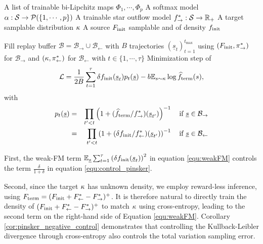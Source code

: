 \documentclass{article}
\theoremstyle{plain}
\theoremstyle{definition}
\theoremstyle{remark}
\theoremstyle{fact}
\begin{document}
\begin{algorithm}
\caption{Ergodic flow: IL training}\label{alg:IL_EGF}
\begin{algorithmic}
 A list of trainable bi-Lipchitz maps $\Phi_1,\cdots, \Phi_p$
 A softmax model $\alpha:\mathcal S \rightarrow \mathcal P(\{1,\cdots,p\})$
 A trainable star outflow  model $f^*_\rightarrow:\mathcal S\rightarrow \mathbb R_+$
 A target samplable distribution $\kappa$
 A source $F_{\mathrm{init}}$  samplable and of  density  $f_{\mathrm{init}}$
 
\REPEAT
\STATE Fill replay buffer $\mathcal B=\mathcal B_{\rightarrow} \cup \mathcal B_{\leftarrow}$ with $B$ trajectories $(\underline s_t)_{t=1}^{t_{\text{max}}}$ using $(F_{\mathrm{init}}, \pi_{\rightarrow}^*)$ for $\mathcal B_{\rightarrow}$ and $(\kappa, \pi_{\leftarrow}^*)$ for $\mathcal B_{\leftarrow}$ with $t\in \{1,\cdots,\tau\}$
\STATE Minimization step of
$$ 
 \mathcal L =\frac{1}{2B}\sum_{t=1}^\tau\delta f_{\mathrm{init}}(\underline s_t)p_t(\underline s)- b \mathbb E_{s\sim \kappa}\log \widehat{f}_{\mathrm{term}}(s),
$$
with 
\begin{eqnarray*}
   p_t(\underline s) &=&\prod_{t'<t}  \left(1+(\widehat{f}_{\mathrm{term}}/f^*_{\rightarrow})(\underline s_{t'})\right)^{-1}\quad \text{if } \underline s\in \mathcal B_{\rightarrow}\\
     &=&\prod_{t'<t}  \left(1+(\delta f_{\mathrm{init}}/f^*_{\leftarrow})(\underline s_{t'})\right)^{-1}\quad \text{if } \underline s\in \mathcal B_{\leftarrow} 
\end{eqnarray*}
\end{algorithmic}
\end{algorithm}


First, the weak-FM term $\mathbb E_{\underline s} \sum_{t=1}^\tau \left(\delta f_{\mathrm{init}}(\underline s_t)\right)^2$ in equation \eqref{equ:weakFM} controls the term $\frac{\delta}{1 + \delta}$ in equation \eqref{equ:control_pinsker}.


Second, since the target $\kappa$ has unknown density, we employ reward-less inference, using $F_{\mathrm{term}} = (F_{\mathrm{init}}+F^*_{\leftarrow}-F^*_{\rightarrow})^+$.
It is therefore natural to directly train the density of  $(F_{\mathrm{init}}+F^*_{\leftarrow}-F^*_{\rightarrow})^+$ to match $\kappa$ using cross-entropy, leading to the second term on the right-hand side of Equation \eqref{equ:weakFM}.
Corollary \ref{cor:pinsker_negative_control} demonstrates that controlling the Kullback-Leibler divergence through cross-entropy also controls the total variation sampling error.
\end{document}
